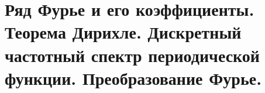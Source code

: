 \chapter{Ряд Фурье и его коэффициенты. Теорема Дирихле. Дискретный частотный
спектр периодической функции. Преобразование Фурье.}

\newpage
